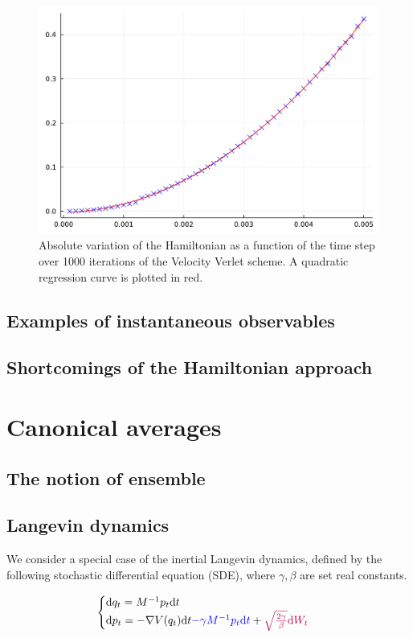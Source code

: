     \begin{figure}[htbp]
        \begin{center}
          \includegraphics[width=0.7\linewidth]{figures/chapter1/energy_fluctuations_verlet.pdf}
          \caption{ \label{fig:energy_verlet}
            Absolute variation of the Hamiltonian as a function of the time step over 1000 iterations of the Velocity Verlet scheme. A quadratic regression curve is plotted in red.
          }
        \end{center}
      \end{figure}

    \subsection{Examples of instantaneous observables}
        
    \subsection{Shortcomings of the Hamiltonian approach}

\section{Canonical averages}
    \subsection{The notion of ensemble}

\subsection{Langevin dynamics}
We consider a special case of the inertial Langevin dynamics, defined by the following stochastic differential equation (SDE), where $\gamma, \beta$ are set real constants.

\begin{equation}
    \label{Langevin}
    \begin{cases}
        \text dq_t=M^{-1}p_t\text dt \\
        \text dp_t= -\nabla V(q_t)\text dt \textcolor{blue}{-\gamma M^{-1}p_t\text dt}+\textcolor{purple}{\sqrt{\frac{2\gamma}\beta}\text dW_t}
    \end{cases}
\end{equation}

